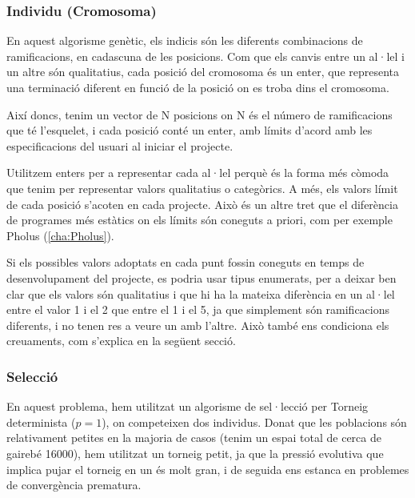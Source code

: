 
\subsubsection{Individu (Cromosoma)}
\label{ssub:individu (cromosoma)}

En aquest algorisme genètic, els indicis són les diferents combinacions de
ramificacions, en cadascuna de les posicions. Com que els canvis entre un al·lel i un
altre són qualitatius, cada posició del cromosoma és un enter, que representa
una terminació diferent en funció de la posició on es troba dins el cromosoma.

Així doncs, tenim un vector de N posicions on N és el número de ramificacions que té
l'esquelet, i cada posició conté un enter, amb límits d'acord amb les
especificacions del usuari al iniciar el projecte. 

Utilitzem enters per a representar cada al·lel perquè és la forma més còmoda que
tenim per representar valors qualitatius o categòrics.  A més, els valors límit
de cada posició s'acoten en cada projecte.  Això és un altre tret que el
diferència de programes més estàtics on els límits són coneguts a priori, com
per exemple Pholus (\ref{cha:Pholus}).

Si els possibles valors adoptats en cada punt fossin coneguts en temps de
desenvolupament del projecte, es podria usar tipus enumerats, per a deixar ben
clar que els valors són qualitatius i que hi ha la mateixa diferència en un
al·lel entre el valor 1 i el 2 que entre el 1 i el 5, ja que simplement són
ramificacions diferents, i no tenen res a veure un amb l'altre.  Això també ens
condiciona els creuaments, com s'explica en la següent secció.


\subsubsection{Selecció} %
\label{ssub:CSeleccio}
En aquest problema, hem utilitzat un algorisme de sel·lecció per Torneig
determinista ($p=1$), on competeixen dos individus.  Donat que les poblacions
són relativament petites en la majoria de casos (tenim un espai total de cerca
de gairebé 16000), hem utilitzat un torneig petit, ja que la pressió evolutiva
que implica pujar el torneig en un és molt gran, i de seguida ens estanca en
problemes de convergència prematura.


